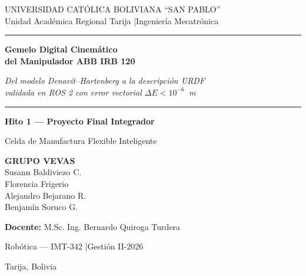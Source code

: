 \documentclass[11pt,a4paper]{article}
\begin{document}
\begin{titlepage}
\centering
\vspace*{1.2cm}

{\color{gris}\large UNIVERSIDAD CATÓLICA BOLIVIANA ``SAN PABLO''}\\[2pt]
{\color{gris} Unidad Académica Regional Tarija \quad|\quad Ingeniería Mecatrónica}

\vspace{2.2cm}

{\color{naranja}\rule{\textwidth}{2pt}}
\vspace{0.7cm}

{\Huge\bfseries Gemelo Digital Cinemático\\[6pt] del Manipulador ABB IRB 120\par}

\vspace{0.7cm}
{\large\itshape Del modelo Denavit--Hartenberg a la descripción URDF\\
validada en ROS 2 con error vectorial $\Delta E < 10^{-6}$~m\par}

\vspace{0.5cm}
{\color{naranja}\rule{\textwidth}{2pt}}

\vspace{1.6cm}

{\large\bfseries Hito 1 — Proyecto Final Integrador\par}
\vspace{4pt}
{\large Celda de Manufactura Flexible Inteligente\par}

\vspace{2.2cm}

\begin{minipage}{0.8\textwidth}
\centering
{\large\bfseries GRUPO VEVAS}\\[10pt]
{\large
Susann Baldiviezo C.\\[3pt]
Florencia Frigerio\\[3pt]
Alejandro Bejarano R.\\[3pt]
Benjamín Soruco G.\\
}
\end{minipage}

\vspace{2.0cm}

{\large \textbf{Docente:} M.Sc. Ing. Bernardo Quiroga Turdera\par}
\vspace{4pt}
{\large Robótica — IMT-342 \quad|\quad Gestión II-2026\par}

\vfill
{\color{gris}\small Tarija, Bolivia}
\end{titlepage}
\end{document}

